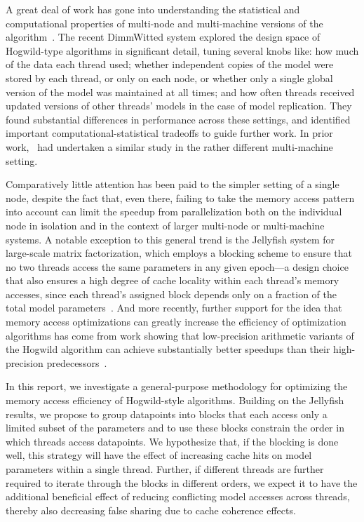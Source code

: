 \documentclass[times,11pt]{article}
\numberwithin{equation}{section}		%
\numberwithin{figure}{section}			%
\numberwithin{table}{section}				%
\begin{document}
A great deal of work has gone into understanding the statistical and computational properties of multi-node and multi-machine versions of the algorithm~\citep{}. The recent DimmWitted system
explored the design space of Hogwild-type algorithms in significant detail, tuning several knobs like: how much of the data each thread used; whether independent copies of the model were stored by each thread,
or only on each node, or whether only a single global version of the model was maintained at all times; and how often threads received updated versions of other threads' models in the case of model replication. They
found substantial differences in performance across these settings, and identified important computational-statistical tradeoffs to guide further work. In prior work,~\citet{} had undertaken a similar study in the
rather different multi-machine setting.

Comparatively little attention has been paid to the simpler setting of a single node, despite the fact that, even there, failing to take the memory access pattern into account can limit the speedup from parallelization
both on the individual node in isolation and in the context of larger multi-node or multi-machine systems. A notable exception to this general trend is the Jellyfish system for large-scale matrix factorization, which employs a 
blocking scheme to ensure that no two threads access the same parameters in any given epoch---a design choice that also ensures a high degree of cache locality within each thread's memory accesses, since each thread's 
assigned block depends only on a fraction of the total model parameters~\citep{}. And more recently, further support for the idea that memory access optimizations can greatly increase the efficiency of optimization algorithms
has come from work showing that low-precision arithmetic variants of the Hogwild algorithm can achieve substantially better speedups than their high-precision predecessors~\citep{}.

In this report, we investigate a general-purpose methodology for optimizing the memory access efficiency of Hogwild-style algorithms. Building on the Jellyfish results, we propose to group datapoints into blocks that each access only a 
limited subset of the parameters and to use these blocks constrain the order in which threads access datapoints. We hypothesize that, if the blocking is done well, this strategy will have the effect of increasing cache hits on model parameters within a single thread.
Further, if different threads are further required to iterate through the blocks in different orders, we expect it to have the additional beneficial effect of reducing conflicting model accesses across threads, thereby also decreasing false sharing due to cache coherence
effects.
\end{document}
